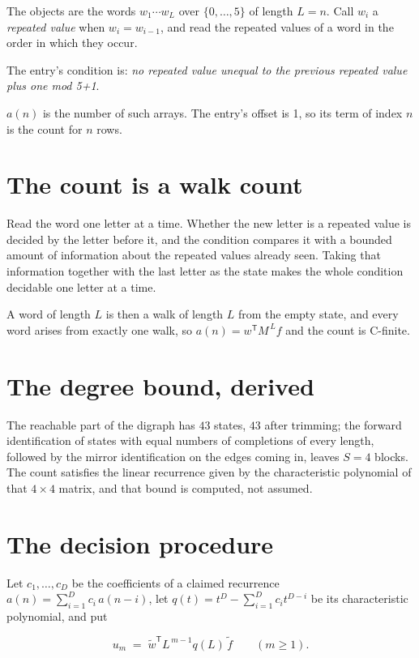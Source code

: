 \documentclass[11pt]{article}
\theoremstyle{definition}
\begin{document}
The objects are the words $w_1\cdots w_L$ over $\{0,\dots,5\}$ of length $L = n$. Call $w_i$ a {\itshape repeated value} when $w_i = w_{i-1}$, and read the repeated values of a word in the order in which they occur.

The entry's condition is: {\itshape no repeated value unequal to the previous repeated value plus one mod 5+1}.

$a(n)$ is the number of such arrays. The entry's offset is 1, so its term of index $n$ is the count for $n$ rows.

\section{The count is a walk count}

Read the word one letter at a time. Whether the new letter is a repeated value is decided by the letter before it, and the condition compares it with a bounded amount of information about the repeated values already seen. Taking that information together with the last letter as the state makes the whole condition decidable one letter at a time.

A word of length $L$ is then a walk of length $L$ from the empty state, and every word arises from exactly one walk, so $a(n) = w^{\mathsf T}M^{\,L}f$ and the count is C-finite.

\section{The degree bound, derived}

The reachable part of the digraph has $43$ states, $43$ after trimming; the forward identification of states with equal numbers of completions of every length, followed by the mirror identification on the edges coming in, leaves $S = 4$ blocks. The count satisfies the linear recurrence given by the characteristic polynomial of that $4\times4$ matrix, and that bound is computed, not assumed.

\section{The decision procedure}

Let $c_1,\dots,c_D$ be the coefficients of a claimed recurrence $a(n) = \sum_{i=1}^{D} c_i\,a(n-i)$, let $q(t) = t^{D} - \sum_{i=1}^{D} c_i t^{D-i}$ be its characteristic polynomial, and put

\[u_m \;=\; \tilde w^{\mathsf T} L^{\,m-1} q(L)\,\tilde f \qquad (m \ge 1).\]
\end{document}
